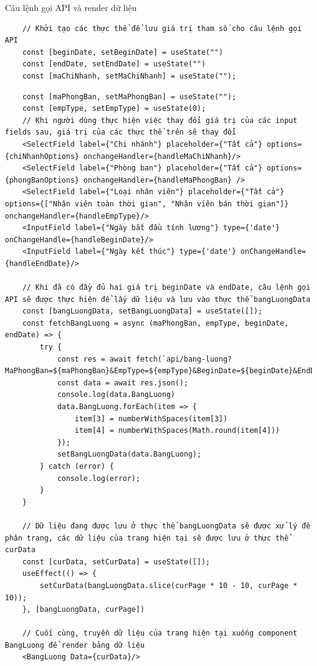 Câu lệnh gọi API và render dữ liệu
\begin{verbatim}
    // Khởi tạo các thực thể để lưu giá trị tham số cho câu lệnh gọi API
    const [beginDate, setBeginDate] = useState("")
    const [endDate, setEndDate] = useState("")
    const [maChiNhanh, setMaChiNhanh] = useState("");
\end{verbatim}
\begin{verbatim}
    const [maPhongBan, setMaPhongBan] = useState("");
    const [empType, setEmpType] = useState(0);
    // Khi người dùng thực hiện việc thay đổi giá trị của các input fields sau, giá trị của các thực thể trên sẽ thay đổi 
    <SelectField label={"Chi nhánh"} placeholder={"Tất cả"} options={chiNhanhOptions} onchangeHandler={handleMaChiNhanh}/>
    <SelectField label={"Phòng ban"} placeholder={"Tất cả"} options={phongBanOptions} onchangeHandler={handleMaPhongBan} />
    <SelectField label={"Loại nhân viên"} placeholder={"Tất cả"} options={["Nhân viên toàn thời gian", "Nhân viên bán thời gian"]} onchangeHandler={handleEmpType}/>
    <InputField label={"Ngày bắt đầu tính lương"} type={'date'} onChangeHandle={handleBeginDate}/>
    <InputField label={"Ngày kết thúc"} type={'date'} onChangeHandle={handleEndDate}/>

    // Khi đã có đầy đủ hai giá trị beginDate và endDate, câu lệnh gọi API sẽ được thực hiện để lấy dữ liệu và lưu vào thực thể bangLuongData
    const [bangLuongData, setBangLuongData] = useState([]);
    const fetchBangLuong = async (maPhongBan, empType, beginDate, endDate) => {
        try {
            const res = await fetch(`api/bang-luong?MaPhongBan=${maPhongBan}&EmpType=${empType}&BeginDate=${beginDate}&EndDate=${endDate}`);
            const data = await res.json();
            console.log(data.BangLuong)
            data.BangLuong.forEach(item => {
                item[3] = numberWithSpaces(item[3])
                item[4] = numberWithSpaces(Math.round(item[4]))
            });
            setBangLuongData(data.BangLuong);
        } catch (error) {
            console.log(error);
        }
    }

    // Dữ liệu đang được lưu ở thực thể bangLuongData sẽ được xử lý để phân trang, các dữ liệu của trang hiện tại sẽ được lưu ở thực thể curData
    const [curData, setCurData] = useState([]);
    useEffect(() => {
        setCurData(bangLuongData.slice(curPage * 10 - 10, curPage * 10));
    }, [bangLuongData, curPage])

    // Cuối cùng, truyền dữ liệu của trang hiện tại xuống component BangLuong để render bảng dữ liệu
    <BangLuong Data={curData}/>
\end{verbatim}

\newpage